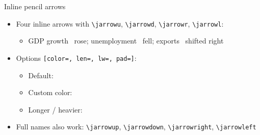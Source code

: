 \documentclass[10pt,itemsep]{beamer}
\begin{document}
\begin{frame}
    {Inline pencil arrows}
    \begin{itemize}
        \item Four inline arrows with \texttt{\textbackslash jarrowu}, \texttt{\textbackslash jarrowd}, \texttt{\textbackslash jarrowr}, \texttt{\textbackslash jarrowl}:
        \begin{itemize}
            \item GDP growth \jarrowu\ rose; unemployment \jarrowd\ fell; exports \jarrowr\ shifted right
        \end{itemize}\bigskip
        \item Options \texttt{[color=, len=, lw=, pad=]}:
        \begin{itemize}
            \item Default: \jarrowu\ \jarrowd\ \jarrowr\ \jarrowl
            \item Custom color: \jarrowu[color=tomato]\ \jarrowd[color=cobalt]\ \jarrowr[color=mint]
            \item Longer / heavier: \jarrowr[len=1.2cm]\ \jarrowr[len=0.6cm,lw=0.12cm]
        \end{itemize}\bigskip
        \item Full names also work: \texttt{\textbackslash jarrowup}, \texttt{\textbackslash jarrowdown}, \texttt{\textbackslash jarrowright}, \texttt{\textbackslash jarrowleft}
    \end{itemize}
\end{frame}
\shownotesblock{}
\end{document}
